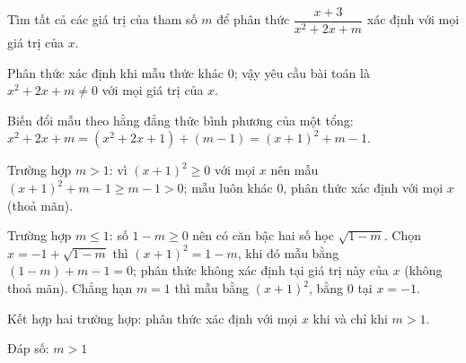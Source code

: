 \begin{problem}[8DS-PS-028]
Tìm tất cả các giá trị của tham số $m$ để phân thức $\dfrac{x + 3}{x^2 + 2x + m}$ xác định với mọi giá trị của $x$.

\begin{solution}
Phân thức xác định khi mẫu thức khác $0$; vậy yêu cầu bài toán là $x^2 + 2x + m \neq 0$ với mọi giá trị của $x$.

Biến đổi mẫu theo hằng đẳng thức bình phương của một tổng: $x^2 + 2x + m = (x^2 + 2x + 1) + (m - 1) = (x + 1)^2 + m - 1$.

Trường hợp $m > 1$: vì $(x + 1)^2 \geq 0$ với mọi $x$ nên mẫu $(x + 1)^2 + m - 1 \geq m - 1 > 0$; mẫu luôn khác $0$, phân thức xác định với mọi $x$ (thoả mãn).

Trường hợp $m \leq 1$: số $1 - m \geq 0$ nên có căn bậc hai số học $\sqrt{1 - m}$. Chọn $x = -1 + \sqrt{1 - m}$ thì $(x + 1)^2 = 1 - m$, khi đó mẫu bằng $(1 - m) + m - 1 = 0$; phân thức không xác định tại giá trị này của $x$ (không thoả mãn). Chẳng hạn $m = 1$ thì mẫu bằng $(x + 1)^2$, bằng $0$ tại $x = -1$.

Kết hợp hai trường hợp: phân thức xác định với mọi $x$ khi và chỉ khi $m > 1$.

Đáp số: $\boxed{m > 1}$
\end{solution}
\end{problem}

